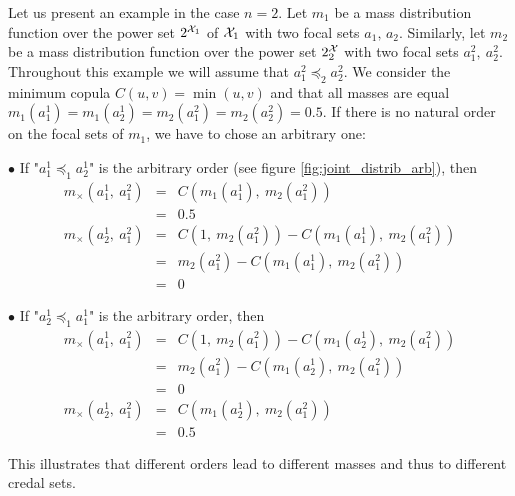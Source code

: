 \begin{example}\label{ex:joint_mass}
    Let us present an example in the case $n=2$. Let $m_1$ be a mass distribution function over the power set $2^{{\mathcal{X}}_1}$ of ${\mathcal{X}}_1$ with two focal sets $a_1,\, a_2$. Similarly, let $m_2$ be a mass distribution function over the power set $2^{\mathcal{X}}_2$ with two focal sets $a_1^2,~a_2^2$. Throughout this example we will assume that $a_1^2\preceq_2a_2^2$. We consider the minimum copula $C(u,v)=\min(u,v)$ and that all masses are equal $m_1(a_1^1)=m_1(a_2^1)=m_2(a_1^2)=m_2(a_2^2)=0.5$.
    If there is no natural order on the focal sets of $m_1$, we have to chose an arbitrary one:\par
    $\bullet$ If "$a_1^1\preceq_1a_2^1$" is the arbitrary order (see figure \ref{fig:joint_distrib_arb}), then
    \begin{eqnarray*}
        m_\times(a_1^1,~a_1^2) &=& C(m_1(a_1^1),~m_2(a_1^2))\\
        &=& 0.5\\
        m_\times(a_2^1,~a_1^2) &=& C(1,~m_2(a_1^2)) - C(m_1(a_1^1),~m_2(a_1^2))\\
        &=& m_2(a_1^2) - C(m_1(a_1^1),~m_2(a_1^2))\\
        &=& 0
    \end{eqnarray*}\par
    $\bullet$ If "$a_2^1\preceq_1a_1^1$" is the arbitrary order, then
    \begin{eqnarray*}
        m_\times(a_1^1,~a_1^2) &=& C(1,~m_2(a_1^2)) - C(m_1(a_2^1),~m_2(a_1^2))\\
        &=& m_2(a_1^2) - C(m_1(a_2^1),~m_2(a_1^2))\\
        &=& 0\\
        m_\times(a_2^1,~a_1^2) &=& C(m_1(a_2^1),~m_2(a_1^2))\\
        &=& 0.5
    \end{eqnarray*}
        
    This illustrates that different orders lead to different masses and thus to different credal sets.
    

\end{example}
